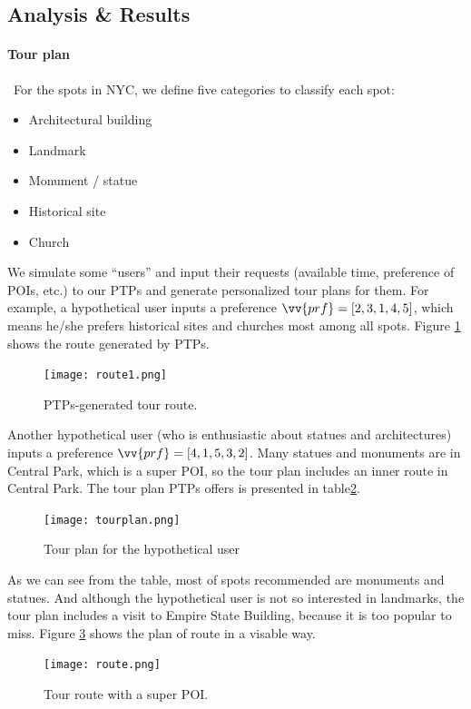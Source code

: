\documentclass{mcmthesis}
\begin{document}
\subsection{Analysis \& Results}
  \paragraph{Tour plan} \
  For the spots in NYC, we define five categories to classify each spot:
  \begin{itemize}
    \item Architectural building
    \item Landmark
    \item Monument / statue
    \item Historical site
    \item Church
  \end{itemize}
  We simulate some ``users'' and input their requests (available time, preference of POIs, etc.) to our PTPs and generate personalized tour plans for them. For example, a hypothetical user inputs a preference $\vv{prf} = [2,3,1,4,5]$, which means he/she prefers historical sites and churches most among all spots. Figure \ref{fig:route1} shows the route generated by PTPs.
  \begin{figure}[ht]
    \centering
    \texttt{[image: route1.png]}
    \caption{PTPs-generated tour route.}
    \label{fig:route1}
  \end{figure}
  Another hypothetical user (who is enthusiastic about statues and architectures) inputs a preference $\vv{prf} = [4, 1, 5, 3, 2]$. Many statues and monuments are in Central Park, which is a super POI, so the tour plan includes an inner route in Central Park. The tour plan PTPs offers is presented in table\ref{fig:table}.
  \begin{figure}[ht]
    \centering
    \texttt{[image: tourplan.png]}
    \caption{Tour plan for the hypothetical user}
    \label{fig:table}
  \end{figure}
  As we can see from the table, most of spots recommended are monuments and statues. And although the hypothetical user is not so interested in landmarks, the tour plan includes a visit to Empire State Building, because it is too popular to miss. Figure \ref{fig:route} shows the plan of route in a visable way.
  \begin{figure}[ht]
    \centering
    \texttt{[image: route.png]}
    \caption{Tour route with a super POI.}
    \label{fig:route}
  \end{figure}
\end{document}
